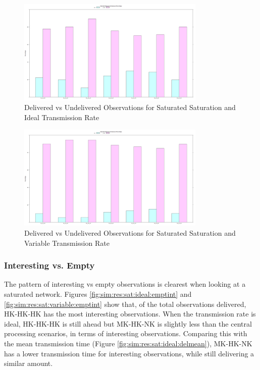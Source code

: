 	\begin{figure}[H]
	\centering
	\includegraphics[width=0.8\textwidth]{Chap7/figures/plots/saturated_ideal/delvsundel_percent.png}
	\caption{Delivered vs Undelivered Observations for Saturated Saturation and Ideal Transmission Rate}
	\label{fig:sim:res:sat:ideal:delundel}
	\end{figure}

	\begin{figure}[H]
	\centering
	\includegraphics[width=0.8\textwidth]{Chap7/figures/plots/saturated_variable/delvsundel_percent.png}
	\caption{Delivered vs Undelivered Observations for Saturated Saturation and Variable Transmission Rate}
	\label{fig:sim:res:sat:variable:delundel}
	\end{figure}

\subsubsection{Interesting vs. Empty}
	The pattern of interesting vs empty observations is clearest when looking at a saturated network. Figures \ref{fig:sim:res:sat:ideal:emptint} and \ref{fig:sim:res:sat:variable:emptint} show that, of the total observations delivered, HK-HK-HK has the most interesting observations. When the transmission rate is ideal, HK-HK-HK is still ahead but MK-HK-NK is slightly less than the central processing scenarios, in terms of interesting observations. Comparing this with the mean transmission time (Figure \ref{fig:sim:res:sat:ideal:delmean}), MK-HK-NK has a lower transmission time for interesting observations, while still delivering a similar amount.


